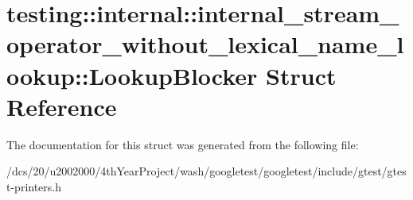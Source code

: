 \hypertarget{structtesting_1_1internal_1_1internal__stream__operator__without__lexical__name__lookup_1_1LookupBlocker}{}\section{testing\+:\+:internal\+:\+:internal\+\_\+stream\+\_\+operator\+\_\+without\+\_\+lexical\+\_\+name\+\_\+lookup\+:\+:Lookup\+Blocker Struct Reference}
\label{structtesting_1_1internal_1_1internal__stream__operator__without__lexical__name__lookup_1_1LookupBlocker}


The documentation for this struct was generated from the following file\+:\begin{DoxyCompactItemize}
\item 
/dcs/20/u2002000/4th\+Year\+Project/wash/googletest/googletest/include/gtest/gtest-\/printers.\+h\end{DoxyCompactItemize}
